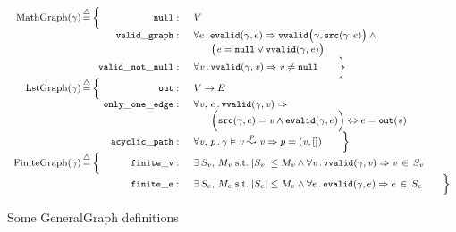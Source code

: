 \begin{figure}
\begin{equation*}
{\footnotesize
\begin{array}{r@{}c@{}c@{\!}rl}
        \mathrm{MathGraph}(\gamma)\,&\defeq&\,\Big\{&\mathtt{null}:&\; V\\
          &&&\mathtt{valid\_graph}:&\; \forall e\,.\,\mathtt{evalid}(\gamma, e) \Rightarrow
          \mathtt{vvalid}\big(\gamma, \mathtt{src}(\gamma, e)\big)\wedge \null \\
          &&&&\qquad \big(\m{e} = \mathtt{null} \vee \mathtt{vvalid}(\gamma, \m{e})\big)\\
          &&&\mathtt{valid\_not\_null}:&\; \forall \m{v}\,.\,\mathtt{vvalid}(\gamma, \m{v})
          \Rightarrow \m{v} \neq \mathtt{null} \qquad \Big\} \\
        \mathrm{LstGraph}(\gamma)\,&\defeq&\, \Big\{&\mathtt{out}:&\; V \rightarrow E\\
          &&&\mathtt{only\_one\_edge}:&\; \forall \m{v},\,e\,.\,
          \mathtt{vvalid}(\gamma, \m{v}) \Rightarrow \\
          &&&&\qquad \Big(\mathtt{src}(\gamma, e) =\m{v} \wedge
                \mathtt{evalid}(\gamma, e)\Big) \Leftrightarrow e = \mathtt{out}(\m{v})\\
          &&&\mathtt{acyclic\_path}:&\; \forall \m{v},\,p\,.\,
          \gamma \vDash \m{v} \overset{p}{\leadsto} \m{v} \Rightarrow p = (\m{v},[]) \qquad \Big\} \\
       	\mathrm{FiniteGraph}(\gamma)\,&\defeq&\, \Big\{&\mathtt{finite\_v}:&\;\exists\, S_\m{v},\, M_\m{v}\;\text{s.t.}\;\lvert S_\m{v}\rvert
          \leq M_\m{v} \wedge
          \forall \m{v}\,.\, \mathtt{vvalid}(\gamma,\m{v})\Rightarrow \m{v}\,\in\,S_\m{v}\\
          &&&\mathtt{finite\_e}:&\;\exists\, S_e,\, M_e\;\text{s.t.}\;\lvert S_e\rvert
          \leq M_e \wedge
          \forall e\,.\, \mathtt{evalid}(\gamma,e)\Rightarrow e\,\in\,S_e \qquad \Big\}
\end{array}}
\end{equation*}
\caption{Some GeneralGraph definitions}
\label{fig:gengraphdefs}
\vspace{-1em}

\end{figure} 